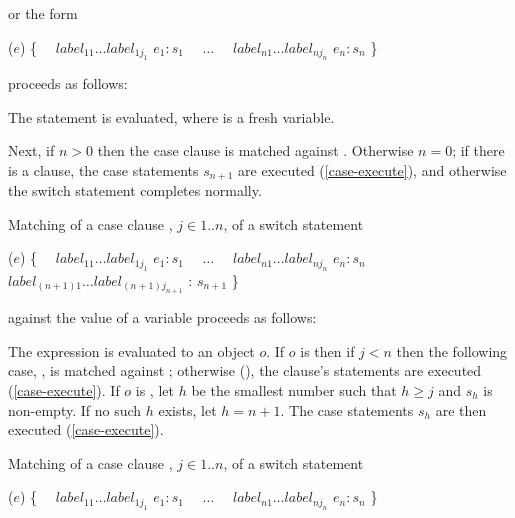 \documentclass[makeidx]{article}
\begin{document}
\noindent
or the form

\begin{normativeDartCode}
\SWITCH{} ($e$) \{
\ \ $label_{11} \ldots label_{1j_1}$ \CASE{} $e_1: s_1$
\ \ $\ldots$
\ \ $label_{n1} \ldots label_{nj_n}$ \CASE{} $e_n: s_n$
\}
\end{normativeDartCode}

\noindent
proceeds as follows:

\LMHash{}%
The statement  is evaluated,
where \id{} is a fresh variable.

\LMHash{}%
Next, if $n > 0$ then the case clause
is matched against \id.
Otherwise $n = 0$;
if there is a \DEFAULT{} clause,
the case statements $s_{n+1}$ are executed (\ref{case-execute}),
and otherwise the switch statement completes normally.

\LMHash{}%
Matching of a case clause ,
$j \in 1 .. n$,
of a switch statement

\begin{normativeDartCode}
\SWITCH{} ($e$) \{
\ \ $label_{11} \ldots label_{1j_1}$ \CASE{} $e_1: s_1$
\ \ $\ldots$
\ \ $label_{n1} \ldots label_{nj_n}$ \CASE{} $e_n: s_n$
\ \ $label_{(n+1)1} \ldots label_{(n+1)j_{n+1}}$ \DEFAULT{}: $s_{n+1}$
\}
\end{normativeDartCode}

\noindent
against the value of a variable \id{} proceeds as follows:

\LMHash{}%
The expression  is evaluated to an object $o$.
If $o$ is \FALSE{} then if $j < n$ then the following case,
, is matched against \id{};
otherwise (),
the \DEFAULT{} clause's statements are executed
(\ref{case-execute}).
If $o$ is \TRUE, let $h$ be the smallest number
such that $h \ge j$ and $s_h$ is non-empty.
If no such $h$ exists, let $h = n + 1$.
The case statements $s_h$ are then executed
(\ref{case-execute}).

\LMHash{}%
Matching of a case clause ,
$j \in 1 .. n$,
of a switch statement

\begin{normativeDartCode}
\SWITCH{} ($e$) \{
\ \ $label_{11} \ldots label_{1j_1}$ \CASE{} $e_1: s_1$
\ \ $\ldots$
\ \ $label_{n1} \ldots label_{nj_n}$ \CASE{} $e_n: s_n$
\}
\end{normativeDartCode}
\end{document}
